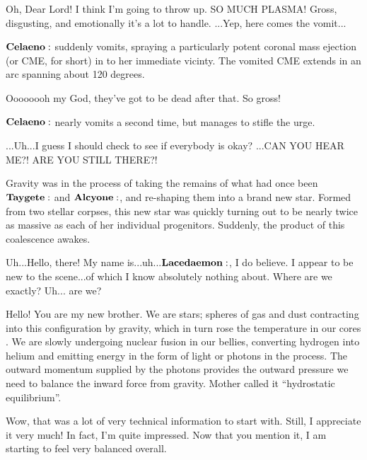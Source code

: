\Celaeno Oh, Dear Lord!  I think I'm going to throw up.  SO MUCH PLASMA!  Gross, disgusting, and emotionally it's a lot to handle. ...Yep, here comes the vomit...

$\Celaeno$ suddenly vomits, spraying a particularly potent coronal mass ejection (or CME, for short) in to her immediate vicinty.  The vomited CME extends in an arc spanning about 120 degrees.

\Celaeno Oooooooh my God, they've got to be dead after that.  So gross!  

$\Celaeno$ nearly vomits a second time, but manages to stifle the urge.

\Celaeno ...Uh...I guess I should check to see if everybody is okay? ...CAN YOU HEAR ME?!  ARE YOU STILL THERE?! 

Gravity was in the process of taking the remains of what had once been $\Taygete$ and $\Alcyone$, and re-shaping them into a brand new star.  Formed from two stellar corpses, this new star was quickly turning out to be nearly twice as massive as each of her individual progenitors.  Suddenly, the product of this coalescence awakes.


\Lacedaemon Uh...Hello, there!  My name is...uh...$\Lacedaemon$, I do believe.  I appear to be new to the scene...of which I know absolutely nothing about.  Where are we exactly?  Uh... are we?

\Celaeno Hello!  You are my new brother.  We are stars; spheres of gas and dust contracting into this configuration by gravity, which in turn rose the temperature in our cores .  We are slowly undergoing nuclear fusion in our bellies, converting hydrogen into helium and emitting energy in the form of light or photons in the process.  The outward momentum supplied by the photons provides the outward pressure we need to balance the inward force from gravity.  Mother called it ``hydrostatic equilibrium''.

\Lacedaemon Wow, that was a lot of very technical information to start with.  Still, I appreciate it very much!  In fact, I'm quite impressed.  Now that you mention it, I am starting to feel very balanced overall.  

